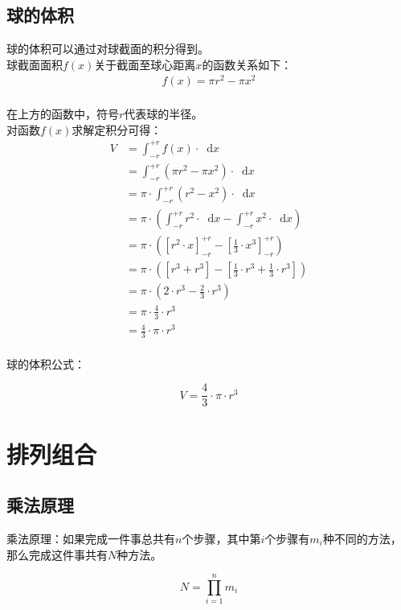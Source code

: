 \documentclass[UTF8]{ctexart}
\newcommand*{\dif}{\mathop{}\!\mathrm{d}}
\begin{document}
\subsection{球的体积}
    球的体积可以通过对球截面的积分得到。\\[3mm]
    球截面面积$f(x)$关于截面至球心距离$x$的函数关系如下：
    \setcounter{equation}{0}
    \begin{align}
        f(x)=\pi r^2-\pi x^2
    \end{align}\\
    在上方的函数中，符号$r$代表球的半径。\\[8mm]
    对函数$f(x)$求解定积分可得：\vspace{3pt}
    \begin{align}
        V
        &=\int_{-r}^{+r}f(x)\cdot\dif x\\[4mm]
        &=\int_{-r}^{+r}\left(\pi r^2-\pi x^2\right)\cdot\dif x\\[4mm]
        &=\pi\cdot\int_{-r}^{+r}\left(r^2-x^2\right)\cdot\dif x\\[4mm]
        &=\pi\cdot\left(\int_{-r}^{+r}r^2\cdot\dif x-\int_{-r}^{+r}x^2\cdot\dif x\right)\\[4mm]
        &=\pi\cdot\left(\left[r^2\cdot x\right]_{-r}^{+r}-\left[\frac{1}{3}\cdot x^3\right]_{-r}^{+r}\right)\\[4mm]
        &=\pi\cdot\left(\left[r^3+r^3\right]-\left[\frac{1}{3}\cdot r^3+\frac{1}{3}\cdot r^3\right]\right)\\[4mm]
        &=\pi\cdot\left(2\cdot r^3-\frac{2}{3}\cdot r^3\right)\\[4mm]
        &=\pi\cdot\frac{4}{3}\cdot r^3\\[4mm]
        &=\frac{4}{3}\cdot\pi\cdot r^3
    \end{align}\\
    球的体积公式：
    \begin{large}
        \begin{equation*}
            V=\frac{4}{3}\cdot\pi\cdot r^3
        \end{equation*}
    \end{large}

\newpage

\section{排列组合}

\subsection{乘法原理}
    乘法原理：如果完成一件事总共有$n$个步骤，其中第$i$个步骤有$m_i$种不同的方法，那么完成这件事共有$N$种方法。
    \begin{large}
        \begin{equation*}
            N=\prod_{i=1}^{n}m_i
        \end{equation*}
    \end{large}
\end{document}
